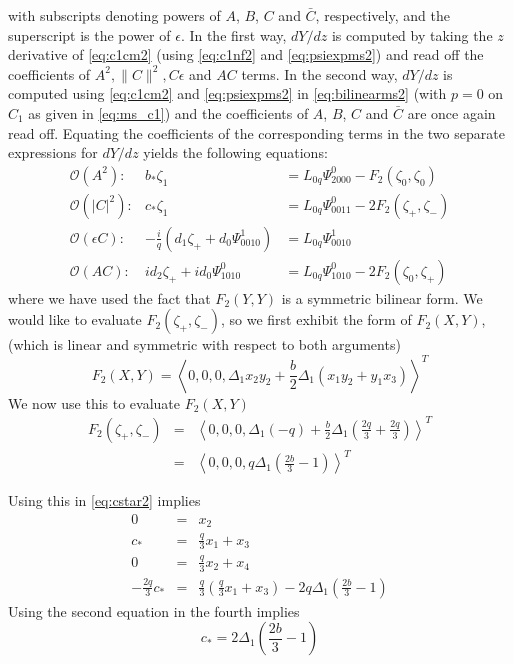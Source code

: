 with subscripts denoting powers of $A$, $B$, $C$ and $\bar{C}$, respectively,
and the superscript is the power of $\epsilon$. In the first way, $dY/dz$ is
computed by taking the $z$ derivative of \eqref{eq:c1cm2} (using \eqref{eq:c1nf2}
and \eqref{eq:psiexpms2}) and read off the coefficients of $A^2, \|C\|^2, C
\epsilon$ and $AC$ terms.  In the second way, $dY/dz$ is computed using
\eqref{eq:c1cm2} and \eqref{eq:psiexpms2} in \eqref{eq:bilinearms2} (with $p=0$ on
$C_1$ as given in \eqref{eq:ms_c1}) and the coefficients of  $A$, $B$, $C$ and
$\bar{C}$ are once again read off.  Equating the coefficients of the
corresponding terms in the two separate expressions for $dY/dz$ yields the
following equations:
\begin{subequations}
\begin{eqnarray}
\mathcal{O}(A^2): &		b_* \zeta_1 &= L_{0q} \Psi_{2000}^0 - F_2(\zeta_0,\zeta_0) \\
\mathcal{O}(\left|C\right|^2):&	c_* \zeta_1 &= L_{0q} \Psi_{0011}^0 -2 F_2(\zeta_+,\zeta_-) \label{eq:cstar2} \\
\mathcal{O}(\epsilon C): &-\frac{i}{q} \left(d_1 \zeta_+ +  d_0 \Psi_{0010}^1\right) &= L_{0q} \Psi_{0010}^1 \\
\mathcal{O}(A C): 	&i d_2 \zeta_+ + i d_0 \Psi_{1010}^0 &= L_{0q} \Psi_{1010}^0 - 2 F_2(\zeta_0,\zeta_+) \label{eq:AC2}
\end{eqnarray}
\end{subequations}
where we have used the fact that $F_2(Y,Y)$ is a symmetric bilinear form. We would like to evaluate $F_2\left(\zeta_+, \zeta_-\right)$, so we first exhibit the form of $F_2(X,Y)$,
(which is linear and symmetric with respect to both arguments)
\begin{equation}
F_2\left(X,Y\right) = \left<0,0,0, \Delta_1 x_2 y_2 + \frac{b}{2}\Delta_1 \left( x_1 y_2 + y_1 x_3 \right) \right>^T
\end{equation}
We now use this to evaluate $F_2\left(X,Y\right)$
\begin{subequations}
\begin{eqnarray}
F_2\left(\zeta_+,\zeta_-\right) &=& \left<0,0,0, \Delta_1 \left(-q\right) + \frac{b}{2}\Delta_1\left( \frac{2q}{3} + \frac{2q}{3}\right)\right>^T \\
 &=& \left<0,0,0, q \Delta_1\left( \frac{2b}{3} - 1 \right) \right>^T
\end{eqnarray}
\end{subequations}

Using this in \eqref{eq:cstar2} implies
\begin{subequations}
\begin{eqnarray}
0 &=& x_2 \\
c_* &=& \frac{q}{3}x_1 + x_3 \\
0 &=& \frac{q}{3}x_2 + x_4 \\
-\frac{2q}{3} c_* &=& \frac{q}{3} \left(\frac{q}{3}x_1 + x_3 \right) - 2 q\Delta_1\left(\frac{2b}{3} - 1\right)
\end{eqnarray}
\end{subequations}
Using the second equation in the fourth implies
\begin{equation}
c_* = 2 \Delta_1 \left( \frac{2 b}{3}  - 1\right)
\end{equation}


